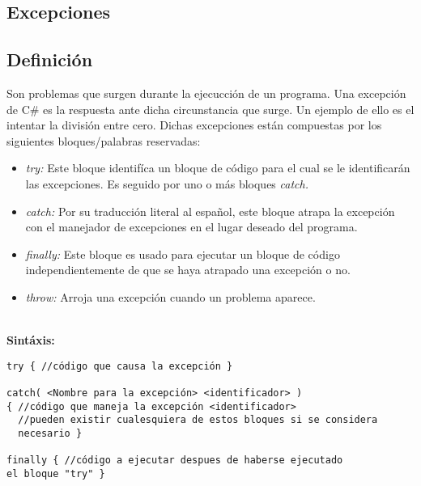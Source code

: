 \documentclass[letterpaper, 12pt]{article}
\begin{document}
    \newpage
    \begin{justify}
        \section{Excepciones}
        \subsection{Definición}
        Son problemas que surgen durante la ejecucción de un programa. Una excepción de C\# es la respuesta ante dicha circunstancia que surge.
        Un ejemplo de ello es el intentar la división entre cero. Dichas excepciones están compuestas por los siguientes bloques/palabras reservadas:
        \begin{itemize}
            \item \emph{try:} Este bloque identifíca un bloque de código para el cual se le identificarán las excepciones. Es seguido por uno o más bloques \emph{catch.}
            \item \emph{catch: }Por su traducción literal al español, este bloque atrapa la excepción con el manejador de excepciones en el lugar deseado del programa.
            \item \emph{finally: }Este bloque es usado para ejecutar un bloque de código independientemente de que se haya atrapado una excepción o no.
            \item \emph{throw: }Arroja una excepción cuando un problema aparece.
        \end{itemize}
        \textbf{\\Sintáxis:}
            \begin{verbatim}
try { //código que causa la excepción }

catch( <Nombre para la excepción> <identificador> ) 
{ //código que maneja la excepción <identificador> 
  //pueden existir cualesquiera de estos bloques si se considera 
  necesario }

finally { //código a ejecutar despues de haberse ejecutado 
el bloque "try" }
            \end{verbatim}

\end{justify}
\end{document}
